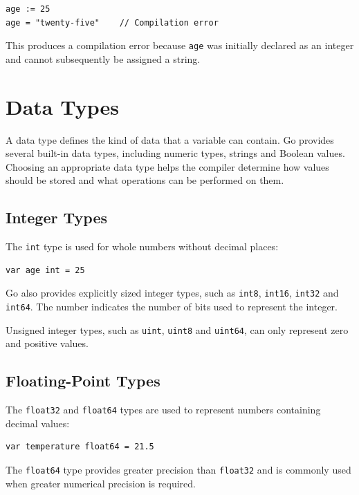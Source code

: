 \begin{lstlisting}
age := 25
age = "twenty-five"    // Compilation error
\end{lstlisting}

This produces a compilation error because \texttt{age} was initially declared
as an integer and cannot subsequently be assigned a string.


\section{Data Types}

A data type defines the kind of data that a variable can contain. Go provides
several built-in data types, including numeric types, strings and Boolean
values. Choosing an appropriate data type helps the compiler determine how
values should be stored and what operations can be performed on them.


\subsection{Integer Types}

The \texttt{int} type is used for whole numbers without decimal places:

\begin{lstlisting}
var age int = 25
\end{lstlisting}

Go also provides explicitly sized integer types, such as \texttt{int8},
\texttt{int16}, \texttt{int32} and \texttt{int64}. The number indicates the
number of bits used to represent the integer.

Unsigned integer types, such as \texttt{uint}, \texttt{uint8} and
\texttt{uint64}, can only represent zero and positive values.


\subsection{Floating-Point Types}

The \texttt{float32} and \texttt{float64} types are used to represent numbers
containing decimal values:

\begin{lstlisting}
var temperature float64 = 21.5
\end{lstlisting}

The \texttt{float64} type provides greater precision than \texttt{float32}
and is commonly used when greater numerical precision is required.


